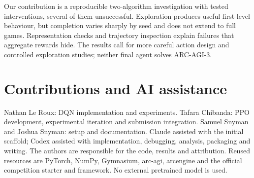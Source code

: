 \documentclass[10pt]{article}
\begin{document}
Our contribution is a reproducible two-algorithm investigation with tested interventions, several of them unsuccessful. Exploration produces useful first-level behaviour, but completion varies sharply by seed and does not extend to full games. Representation checks and trajectory inspection explain failures that aggregate rewards hide. The results call for more careful action design and controlled exploration studies; neither final agent solves ARC-AGI-3.

\section*{Contributions and AI assistance}
Nathan Le Roux: DQN implementation and experiments. Tafara Chibanda: PPO development, experimental iteration and submission integration. Samuel Snyman and Joshua Snyman: setup and documentation. Claude assisted with the initial scaffold; Codex assisted with implementation, debugging, analysis, packaging and writing. The authors are responsible for the code, results and attribution. Reused resources are PyTorch, NumPy, Gymnasium, arc-agi, arcengine and the official competition starter and framework. No external pretrained model is used.
\end{document}
